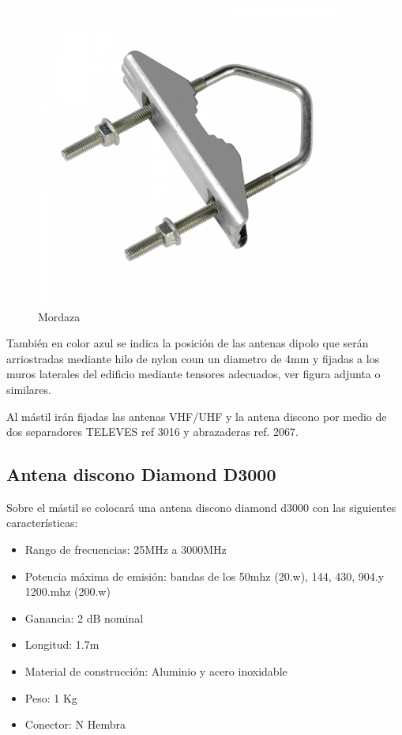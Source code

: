 \documentclass[letterpaper, 10pt]{article} %
\begin{document}
\begin{figure}[h!]
	\centering
	\includegraphics[width=10cm]{img/mordaza2.pdf}
	\caption{Mordaza}
	\label{fig:mordaza2}
\end{figure}


También en color azul se indica la posición de las antenas dipolo que serán arriostradas mediante hilo de nylon coun un diametro de 4mm y fijadas a los muros laterales del edificio mediante tensores adecuados, ver figura adjunta o similares.

Al mástil irán fijadas las antenas VHF/UHF y la antena discono por medio de dos separadores TELEVES ref 3016 y abrazaderas ref. 2067.

\subsection{Antena discono Diamond D3000}

Sobre el mástil se colocará una antena discono diamond d3000 con las siguientes características:
\begin{itemize}
	\item Rango de frecuencias: 25MHz a 3000MHz
	\item Potencia máxima de emisión: bandas de los 50mhz (20.w), 144, 430, 904.y 1200.mhz (200.w)
	\item Ganancia: 2 dB nominal
	\item Longitud: 1.7m
	\item Material de construcción: Aluminio y acero inoxidable
	\item Peso: 1 Kg
	\item Conector: N Hembra
	 
\end{itemize}
\end{document}
